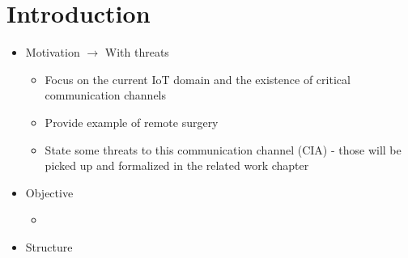 \chapter{Introduction}
\begin{itemize}
    \item Motivation $\rightarrow$ With threats
    \begin{itemize}
        \item Focus on the current IoT domain and the existence of critical communication channels
        \item Provide example of remote surgery
        \item State some threats to this communication channel (CIA) - those will be picked up and formalized in the related work chapter
    \end{itemize}

    \item Objective
    \begin{itemize}
        \item
    \end{itemize}

    \item Structure
\end{itemize}
